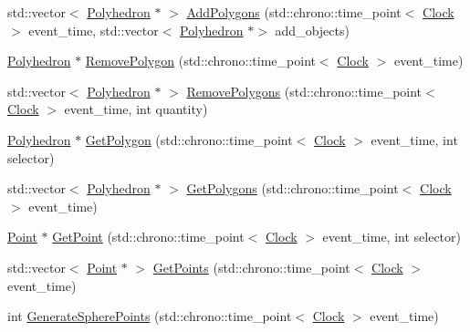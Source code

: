 \begin{DoxyCompactItemize}
\item 
std\+::vector$<$ \mbox{\hyperlink{class_polyhedron}{Polyhedron}} $\ast$ $>$ \mbox{\hyperlink{class_polyhedron_a9564a286e7323b56667971b851f0674a}{Add\+Polygons}} (std\+::chrono\+::time\+\_\+point$<$ \mbox{\hyperlink{universe_8h_a0ef8d951d1ca5ab3cfaf7ab4c7a6fd80}{Clock}} $>$ event\+\_\+time, std\+::vector$<$ \mbox{\hyperlink{class_polyhedron}{Polyhedron}} $\ast$$>$ add\+\_\+objects)
\item 
\mbox{\hyperlink{class_polyhedron}{Polyhedron}} $\ast$ \mbox{\hyperlink{class_polyhedron_a3b411fa617291a2a2d5df92b819285b4}{Remove\+Polygon}} (std\+::chrono\+::time\+\_\+point$<$ \mbox{\hyperlink{universe_8h_a0ef8d951d1ca5ab3cfaf7ab4c7a6fd80}{Clock}} $>$ event\+\_\+time)
\item 
std\+::vector$<$ \mbox{\hyperlink{class_polyhedron}{Polyhedron}} $\ast$ $>$ \mbox{\hyperlink{class_polyhedron_a5c2639b21aec25b76449fdf4c209aad1}{Remove\+Polygons}} (std\+::chrono\+::time\+\_\+point$<$ \mbox{\hyperlink{universe_8h_a0ef8d951d1ca5ab3cfaf7ab4c7a6fd80}{Clock}} $>$ event\+\_\+time, int quantity)
\item 
\mbox{\hyperlink{class_polyhedron}{Polyhedron}} $\ast$ \mbox{\hyperlink{class_polyhedron_a8b197b9eb163bdc83d9669d592bacac1}{Get\+Polygon}} (std\+::chrono\+::time\+\_\+point$<$ \mbox{\hyperlink{universe_8h_a0ef8d951d1ca5ab3cfaf7ab4c7a6fd80}{Clock}} $>$ event\+\_\+time, int selector)
\item 
std\+::vector$<$ \mbox{\hyperlink{class_polyhedron}{Polyhedron}} $\ast$ $>$ \mbox{\hyperlink{class_polyhedron_adeaf461cc8504a225f6344b954c196a8}{Get\+Polygons}} (std\+::chrono\+::time\+\_\+point$<$ \mbox{\hyperlink{universe_8h_a0ef8d951d1ca5ab3cfaf7ab4c7a6fd80}{Clock}} $>$ event\+\_\+time)
\item 
\mbox{\hyperlink{class_point}{Point}} $\ast$ \mbox{\hyperlink{class_polyhedron_a4d61f89c56e15d96008856cfb540d558}{Get\+Point}} (std\+::chrono\+::time\+\_\+point$<$ \mbox{\hyperlink{universe_8h_a0ef8d951d1ca5ab3cfaf7ab4c7a6fd80}{Clock}} $>$ event\+\_\+time, int selector)
\item 
std\+::vector$<$ \mbox{\hyperlink{class_point}{Point}} $\ast$ $>$ \mbox{\hyperlink{class_polyhedron_a1430429d6c8447e90b8c94ca46496a59}{Get\+Points}} (std\+::chrono\+::time\+\_\+point$<$ \mbox{\hyperlink{universe_8h_a0ef8d951d1ca5ab3cfaf7ab4c7a6fd80}{Clock}} $>$ event\+\_\+time)
\item 
int \mbox{\hyperlink{class_polyhedron_a15d1cae35ceb6c1ba559928fd417800c}{Generate\+Sphere\+Points}} (std\+::chrono\+::time\+\_\+point$<$ \mbox{\hyperlink{universe_8h_a0ef8d951d1ca5ab3cfaf7ab4c7a6fd80}{Clock}} $>$ event\+\_\+time)
$$
\end{DoxyCompactItemize}
